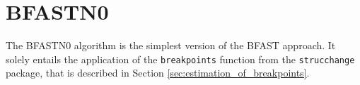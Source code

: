 \documentclass[main.tex]{subfiles}
\begin{document}
\section{BFASTN0}
\label{sec:bfast0n}
The BFASTN0 algorithm is the simplest version of the BFAST approach. It solely entails
the application of the \texttt{breakpoints} function from the
\texttt{strucchange} package, that is described in Section \ref{sec:estimation_of_breakpoints}.

\biblio
\end{document}
